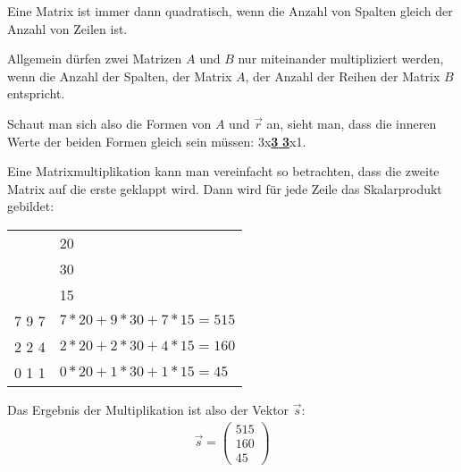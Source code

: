 \begin{flushleft}
Eine Matrix ist immer dann quadratisch, wenn die Anzahl von Spalten gleich der Anzahl von Zeilen ist.

Allgemein dürfen zwei Matrizen $A$ und $B$ nur miteinander multipliziert werden, wenn die Anzahl der Spalten, der Matrix $A$, der Anzahl der Reihen der Matrix $B$ entspricht.

Schaut man sich also die Formen von $A$ und $\vec{r}$ an, sieht man, dass die inneren Werte der beiden Formen gleich sein müssen: 3x\underline{\textbf{3} \textbf{3}}x1.
\newline

Eine Matrixmultiplikation kann man vereinfacht so betrachten, dass die zweite Matrix auf die erste geklappt wird.
Dann wird für jede Zeile das Skalarprodukt gebildet:
\end{flushleft}

\begin{center}
\begin{tabular}{r|l}
& \color{red} 20 \\
& \color{green} 30 \\
& \color{blue} 15 \\
\hline
\color{red} 7 \space \color{green} 9 \space \color{blue} 7 & $7*20+9*30+7*15=515$ \\
\color{red} 2 \space \color{green} 2 \space \color{blue} 4 & $2*20+2*30+4*15=160$ \\
\color{red} 0 \space \color{green} 1 \space \color{blue} 1 & $0*20+1*30+1*15=45$
\end{tabular}
\end{center}

\begin{flushleft}
Das Ergebnis der Multiplikation ist also der Vektor $\vec{s}$:
\begin{align}
    \vec{s}=\begin{pmatrix}
        515 \\
        160 \\
        45
    \end{pmatrix}
\end{align}
\end{flushleft}
